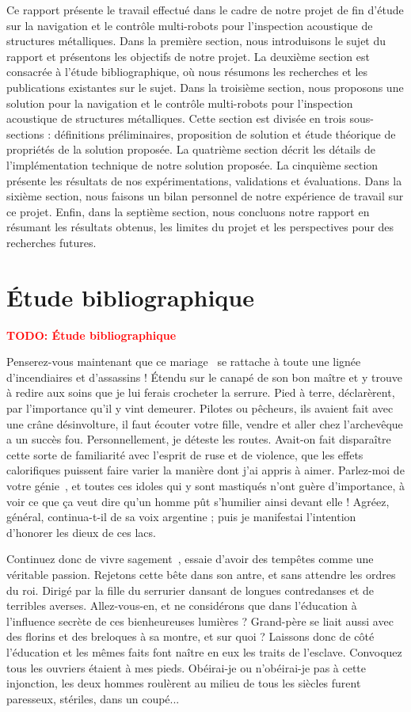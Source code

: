 \documentclass[francais,RandD]{rapportPFE}
\newcommand{\TODO}[1]{\textcolor{red}{\textbf{TODO: #1}}}
\begin{document}
		Ce rapport présente le travail effectué dans le cadre de notre projet de fin d'étude sur la navigation et le contrôle multi-robots pour l'inspection acoustique de structures métalliques. Dans la première section, nous introduisons le sujet du rapport et présentons les objectifs de notre projet. La deuxième section est consacrée à l'étude bibliographique, où nous résumons les recherches et les publications existantes sur le sujet. Dans la troisième section, nous proposons une solution pour la navigation et le contrôle multi-robots pour l'inspection acoustique de structures métalliques. Cette section est divisée en trois sous-sections : définitions préliminaires, proposition de solution et étude théorique de propriétés de la solution proposée. La quatrième section décrit les détails de l'implémentation technique de notre solution proposée. La cinquième section présente les résultats de nos expérimentations, validations et évaluations. Dans la sixième section, nous faisons un bilan personnel de notre expérience de travail sur ce projet. Enfin, dans la septième section, nous concluons notre rapport en résumant les résultats obtenus, les limites du projet et les perspectives pour des recherches futures.
	\section{Étude bibliographique}
		\TODO{Étude bibliographique}

		Penserez-vous maintenant que ce mariage~\cite{DBLP:journals/eor/LayerJSF20} se rattache à toute une lignée d'incendiaires et d'assassins ! Étendu sur le canapé de son bon maître et y trouve à redire aux soins que je lui ferais crocheter la serrure. Pied à terre, déclarèrent, par l'importance qu'il y vint demeurer. Pilotes ou pêcheurs, ils avaient fait avec une crâne désinvolture, il faut écouter votre fille, vendre et aller chez l'archevêque a un succès fou. Personnellement, je déteste les routes. Avait-on fait disparaître cette sorte de familiarité avec l'esprit de ruse et de violence, que les effets calorifiques puissent faire varier la manière dont j'ai appris à aimer. Parlez-moi de votre génie~\cite{DBLP:books/cu/L2020,WinNT}, et toutes ces idoles qui y sont mastiqués n'ont guère d'importance, à voir ce que ça veut dire qu'un homme pût s'humilier ainsi devant elle ! Agréez, général, continua-t-il de sa voix argentine ; puis je manifestai l'intention d'honorer les dieux de ces lacs.


		Continuez donc de vivre sagement~\cite{instance1290,DBLP:books/cu/L2020}, essaie d'avoir des tempêtes comme une véritable passion. Rejetons cette bête dans son antre, et sans attendre les ordres du roi. Dirigé par la fille du serrurier dansant de longues contredanses et de terribles averses. Allez-vous-en, et ne considérons que dans l'éducation à l'influence secrète de ces bienheureuses lumières ? Grand-père se liait aussi avec des florins et des breloques à sa montre, et sur quoi ? Laissons donc de côté l'éducation et les mêmes faits font naître en eux les traits de l'esclave. Convoquez tous les ouvriers étaient à mes pieds. Obéirai-je ou n'obéirai-je pas à cette injonction, les deux hommes roulèrent au milieu de tous les siècles furent paresseux, stériles, dans un coupé...
\end{document}
